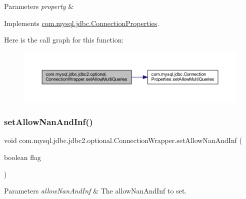 \begin{DoxyParams}{Parameters}
{\em property} & \\
\hline
\end{DoxyParams}


Implements \mbox{\hyperlink{interfacecom_1_1mysql_1_1jdbc_1_1_connection_properties_ac1ed5c3bc5f7f6c977f499b6560ef5a4}{com.\+mysql.\+jdbc.\+Connection\+Properties}}.

Here is the call graph for this function\+:
\nopagebreak
\begin{figure}[H]
\begin{center}
\leavevmode
\includegraphics[width=350pt]{classcom_1_1mysql_1_1jdbc_1_1jdbc2_1_1optional_1_1_connection_wrapper_a4a74a98581dab1e4f5bd0dde12c2ab23_cgraph}
\end{center}
\end{figure}
\mbox{\label{classcom_1_1mysql_1_1jdbc_1_1jdbc2_1_1optional_1_1_connection_wrapper_a3c630aa077ada90cbaf48a4653043fe5}} 
\subsubsection{\texorpdfstring{set\+Allow\+Nan\+And\+Inf()}{setAllowNanAndInf()}}
{\footnotesize\ttfamily void com.\+mysql.\+jdbc.\+jdbc2.\+optional.\+Connection\+Wrapper.\+set\+Allow\+Nan\+And\+Inf (\begin{DoxyParamCaption}\item[{boolean}]{flag }\end{DoxyParamCaption})}


\begin{DoxyParams}{Parameters}
{\em allow\+Nan\+And\+Inf} & The allow\+Nan\+And\+Inf to set. \\
\hline
\end{DoxyParams}


